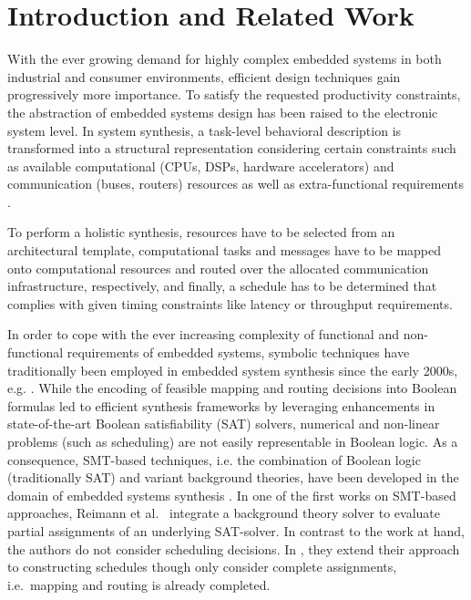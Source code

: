 \section{Introduction and Related Work}
With the ever growing demand for highly complex embedded systems in both industrial and consumer environments, efficient design techniques gain progressively more importance. 
To satisfy the requested productivity constraints, the abstraction of embedded systems design has been raised to the electronic system level. 
In system synthesis, a task-level behavioral description is transformed into a structural representation considering certain constraints such as available computational (CPUs, DSPs,  hardware accelerators) and communication (buses, routers) resources as well as extra-functional requirements \cite{Gerstlauer2009}. \par
To perform a holistic synthesis, resources have to be selected from an architectural template, 
computational tasks and messages have to be mapped onto computational resources and routed over the allocated communication infrastructure, respectively, and finally, 
a schedule has to be determined that complies with given timing constraints like latency or throughput requirements.\par
In order to cope with the ever increasing complexity of functional and non-functional requirements of embedded systems, 
symbolic techniques have traditionally been employed in embedded system synthesis since the early 2000s, e.g. \cite{Haubelt2003,Lukasiewycz2009,Lukasiewycz2012}. 
While the encoding of feasible mapping and routing decisions into Boolean formulas led to efficient synthesis frameworks by leveraging enhancements in state-of-the-art Boolean satisfiability (SAT) solvers, 
numerical and non-linear problems (such as scheduling) are not easily representable in Boolean logic. 
As a consequence, SMT-based techniques, i.e. the combination of Boolean logic (traditionally SAT) and variant background theories, have been developed in the domain of embedded systems synthesis \cite{Satish2007,Reimann2010,Andres2015,Biewer2015,Liu2011}. 
In one of the first works on SMT-based approaches, Reimann et al.\ \cite{Reimann2010} integrate a background theory solver to evaluate partial assignments of an underlying SAT-solver. 
In contrast to the work at hand, the authors do not consider scheduling decisions. 
In \cite{Reimann2011}, they extend their approach to constructing schedules though only consider complete assignments, i.e.\ mapping and routing is already completed.\par
